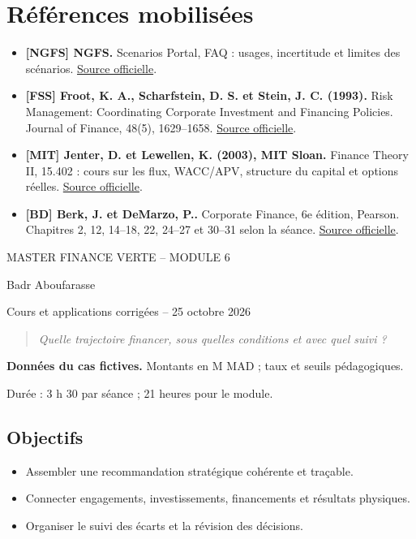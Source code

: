 \documentclass[12pt,a4paper]{article}
\begin{document}
\section*{Références mobilisées}
\small
\begin{itemize}
\item \textbf{[NGFS] NGFS.} Scenarios Portal, FAQ : usages, incertitude et limites des scénarios. \href{https://www.ngfs.net/ngfs-scenarios-portal/faq/}{Source officielle}.
\item \textbf{[FSS] Froot, K. A., Scharfstein, D. S. et Stein, J. C. (1993).} Risk Management: Coordinating Corporate Investment and Financing Policies. Journal of Finance, 48(5), 1629--1658. \href{https://doi.org/10.1111/j.1540-6261.1993.tb05123.x}{Source officielle}.
\item \textbf{[MIT] Jenter, D. et Lewellen, K. (2003), MIT Sloan.} Finance Theory II, 15.402 : cours sur les flux, WACC/APV, structure du capital et options réelles. \href{https://ocw.mit.edu/courses/15-402-finance-theory-ii-spring-2003/pages/lecture-notes/}{Source officielle}.
\item \textbf{[BD] Berk, J. et DeMarzo, P..} Corporate Finance, 6e édition, Pearson. Chapitres 2, 12, 14--18, 22, 24--27 et 30--31 selon la séance. \href{https://www.pearson.com/en-us/subject-catalog/p/corporate-finance/P200000009791/9780137844906}{Source officielle}.
\end{itemize}\normalsize
\clearpage
\begin{center}{\small MASTER FINANCE VERTE -- MODULE 6}\par\vspace{8pt}{\Large\bfseries Séance 6 -- Décision intégrée et pilotage financier de la transition}\par\vspace{6pt}Badr Aboufarasse\par{\small Cours et applications corrigées -- 25 octobre 2026}\end{center}
\begin{quote}\itshape Quelle trajectoire financer, sous quelles conditions et avec quel suivi ?\end{quote}
\textbf{Données du cas fictives.} Montants en M MAD ; taux et seuils pédagogiques.\par Durée : 3 h 30 par séance ; 21 heures pour le module.

\subsection*{Objectifs}
\begin{itemize}\item Assembler une recommandation stratégique cohérente et traçable.\item Connecter engagements, investissements, financements et résultats physiques.\item Organiser le suivi des écarts et la révision des décisions.\end{itemize}
\end{document}
